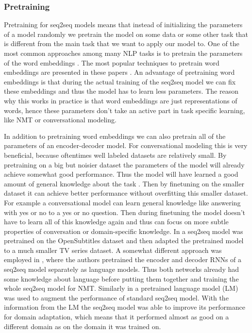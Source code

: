 \documentclass[12pt]{article}
\begin{document}
\subsubsection{Pretraining} \label{sssec:pretrain}
Pretraining for seq2seq models means that instead of initializing the parameters of a model randomly we pretrain the model on some data or some other task that is different from the main task that we want to apply our model to. One of the most common approaches among many NLP tasks is to pretrain the parameters of the word embeddings \cite{Chen:2014,Serban:2015,Akasaki:2017,Lample:2016,Serban:2017}. The most popular techniques to pretrain word embeddings are presented in these papers \cite{Mikolov:2013,Mikolov_skipgram:2013}. An advantage of pretraining word embeddings is that during the actual training of the seq2seq model we can fix these embeddings and thus the model has to learn less parameters. The reason why this works in practice is that word embeddings are just representations of words, hence these parameters don't take an active part in task specific learning, like NMT or conversational modeling.

In addition to pretraining word embeddings we can also pretrain all of the parameters of an encoder-decoder model. For conversational modeling this is very beneficial, because oftentimes well labeled datasets are relatively small. By pretraining on a big but noisier dataset the parameters of the model will already achieve somewhat good performance. Thus the model will have learned a good amount of general knowledge about the task \cite{Li:2016,Serban:2015}. Then by finetuning on the smaller dataset it can achieve better performance without overfitting this smaller dataset. For example a conversational model can learn general knowledge like answering with yes or no to a yes or no question. Then during finetuning the model doesn't have to learn all of this knowledge again and thus can focus on more subtle properties of conversation or domain-specific knowledge. In \cite{Li:2016} a seq2seq model was pretrained on the OpenSubtitles dataset \cite{OpenSubtitles:2016} and then adapted the pretrained model to a much smaller TV series dataset. A somewhat different approach was employed in \cite{Ramachandran:2016}, where the authors pretrained the encoder and decoder RNNs of a seq2seq model separately as language models. Thus both networks already had some knowledge about language before putting them together and training the whole seq2seq model for NMT. Similarly in \cite{Sriram:2017} a pretrained language model (LM) was used to augment the performance of standard seq2seq model. With the information from the LM the seq2seq model was able to improve its performance for domain adaptation, which means that it performed almost as good on a different domain as on the domain it was trained on.
\end{document}
